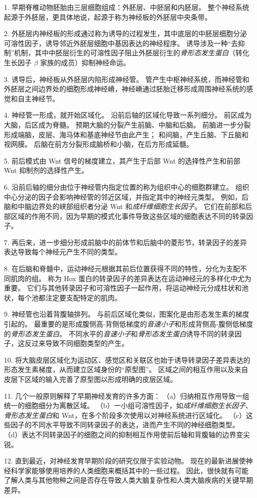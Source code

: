 1. 早期脊椎动物胚胎由三层细胞组成：外胚层、中胚层和内胚层。
整个神经系统起源于外胚层，更具体地说，起源于称为神经板的外胚层中央条带。 


2. 外胚层内神经板的形成通过称为诱导的过程发生，其中底层的中胚层细胞分泌可溶性因子，诱导邻近外胚层细胞中基因表达的神经程序。
诱导涉及一种“去抑制”机制，其中中胚层衍生的可溶性因子阻止外胚层衍生的\textit{骨形态发生蛋白}（转化生长因子 $\beta$ 家族的成员）抑制神经命运。 


3. 诱导后，神经板从外胚层内陷形成神经管。
管产生中枢神经系统，而神经管和外胚层之间边界处的细胞形成神经嵴，神经嵴通过胚胎迁移形成周围神经系统的感觉和自主神经节。


4. 神经管一形成，就开始区域化。
沿前后轴的区域化导致一系列细分。
前区成为大脑，后区成为脊髓。 预期大脑的分裂产生前脑、中脑和后脑。
前脑进一步分裂形成端脑，皮层、海马体和基底神经节由此产生；
和间脑，产生丘脑、下丘脑和视网膜。
后脑在前方分裂形成脑桥和小脑，在后方形成延髓。


5. 前后模式由 Wnt 信号的梯度建立，其产生于后部 Wnt 的选择性产生和前部 Wnt 抑制剂的选择性产生。 


6. 沿前后轴的细分由位于神经管内指定位置的称为组织中心的细胞群建立。
组织中心分泌的因子会影响神经管的邻近区域，并指定其中的神经元类型。
例如，后脑和中脑边界处的峡部组织者分泌 Wnt 和\textit{成纤维细胞生长因子}。
它们在前部和后部区域的作用不同，因为早期的模式化事件导致这些区域的细胞表达不同的转录因子。


7. 再后来，进一步细分形成前脑中的前体节和后脑中的菱形节，转录因子的差异表达导致每个神经元产生不同的类型。 


8. 在后脑和脊髓中，运动神经元根据其前后位置获得不同的特性，分化为支配不同肌肉的组。
称为 Hox 蛋白的转录因子的差异表达在运动神经元的多样化中尤为重要。
它们与其他转录因子和可溶性因子一起作用，将运动神经元分成柱状和池状，每个池都注定要支配特定的肌肉。 


9. 神经管也沿着背腹轴排列。
与前后区域化类似，图案化是由形态发生素的梯度引起的。
最重要的是形成腹侧高-背侧低梯度的\textit{音速小子}和形成背侧高-腹侧低梯度的\textit{骨形态发生蛋白}。
不同水平的\textit{音速小子}和\textit{骨形态发生蛋白}诱导不同的转录因子，这反过来导致不同细胞类型的产生。 


10. 将大脑皮层区域化为运动区、感觉区和关联区也始于诱导转录因子差异表达的形态发生素梯度，从而建立区域身份的“原型图”。
区域之间的相互作用以及来自皮层下区域的输入完善了原型图以形成明确的皮层区域。 


11. 几个一般原则解释了早期神经发育的许多方面： 
（a）归纳相互作用导致一组统一的细胞细分为离散区域。
（b）一小组可溶性因子，如\textit{成纤维细胞生长因子}、\textit{骨形态发生蛋白}和 Wnt，在多个阶段多次使用以对神经系统进行区域化。
（c）这些因子的不同水平导致不同转录因子的表达，进而产生不同的神经细胞类型。
（d）表达不同转录因子的细胞之间的抑制相互作用使前后轴和背腹轴的边界变尖锐。


12. 直到最近，对神经发育早期阶段的研究仅限于实验动物。
现在的最新进展使神经科学家能够使用培养的人类细胞来概括其中的一些过程。
因此，很快就有可能了解人类与其他物种之间是否存在导致人类大脑复杂性和人类大脑疾病的关键早期差异。

